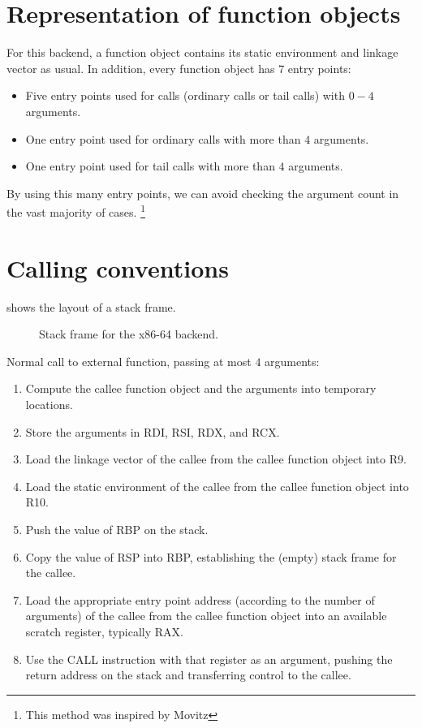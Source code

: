\section{Representation of function objects}

For this backend, a function object contains its static environment
and linkage vector as usual.  In addition, every function object has
$7$ entry points:

\begin{itemize}
\item Five entry points used for calls (ordinary calls or tail calls)
  with $0 - 4$ arguments.
\item One entry point used for ordinary calls with more than $4$
  arguments.
\item One entry point used for tail calls with more than $4$
  arguments.
\end{itemize}

By using this many entry points, we can avoid checking the argument
count in the vast majority of cases.%
\footnote{This method was inspired by Movitz}

\section{Calling conventions}

 shows the layout of a stack frame. 

\begin{figure}
\begin{center}
\end{center}
\caption{\label{fig-x86-64-stack-frame}
Stack frame for the x86-64 backend.}
\end{figure}

Normal call to external function, passing at most $4$ arguments:

\begin{enumerate}
\item Compute the callee function object and the arguments into
  temporary locations.
\item Store the arguments in RDI, RSI, RDX, and RCX.
\item Load the linkage vector of the callee from the callee
  function object into R9.
\item Load the static environment of the callee from the callee
  function object into R10.
\item Push the value of RBP on the stack.
\item Copy the value of RSP into RBP, establishing the
  (empty) stack frame for the callee.
\item Load the appropriate entry point address (according to the
  number of arguments) of the callee from the callee function object
  into an available scratch register, typically RAX.
\item Use the CALL instruction with that register as an argument,
  pushing the return address on the stack and transferring control to
  the callee.
\end{enumerate}

